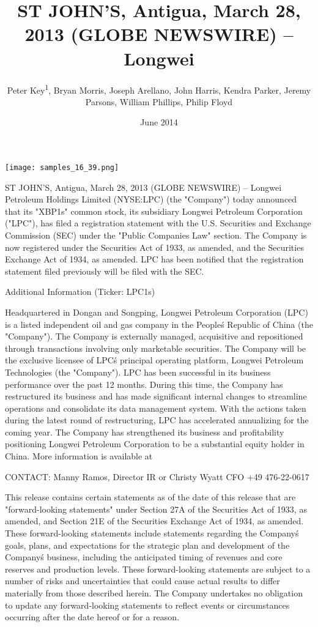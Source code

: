 \documentclass{article}
\title{ST JOHN’S, Antigua, March 28, 2013 (GLOBE NEWSWIRE) -- Longwei}
\author{Peter Key\textsuperscript{1},  Bryan Morris,  Joseph Arellano,  John Harris,  Kendra Parker,  Jeremy Parsons,  William Phillips,  Philip Floyd}
\affil{\textsuperscript{1}Obihiro University of Agriculture and Veterinary Medicine}
\date{June 2014}
\begin{document}
\maketitle

\begin{center}
\begin{minipage}{0.75\linewidth}
\texttt{[image: samples\_16\_39.png]}
\end{minipage}
\end{center}

ST JOHN’S, Antigua, March 28, 2013 (GLOBE NEWSWIRE) -- Longwei Petroleum Holdings Limited (NYSE:LPC) (the "Company") today announced that its "XBP1s" common stock, its subsidiary Longwei Petroleum Corporation ("LPC"), has filed a registration statement with the U.S. Securities and Exchange Commission (SEC) under the "Public Companies Law" section. The Company is now registered under the Securities Act of 1933, as amended, and the Securities Exchange Act of 1934, as amended. LPC has been notified that the registration statement filed previously will be filed with the SEC.

Additional Information (Ticker: LPC1s)

Headquartered in Dongan and Songping, Longwei Petroleum Corporation (LPC) is a listed independent oil and gas company in the People\'s Republic of China (the "Company"). The Company is externally managed, acquisitive and repositioned through transactions involving only marketable securities. The Company will be the exclusive licensee of LPC\'s principal operating platform, Longwei Petroleum Technologies (the "Company"). LPC has been successful in its business performance over the past 12 months. During this time, the Company has restructured its business and has made significant internal changes to streamline operations and consolidate its data management system. With the actions taken during the latest round of restructuring, LPC has accelerated annualizing for the coming year. The Company has strengthened its business and profitability positioning Longwei Petroleum Corporation to be a substantial equity holder in China. More information is available at

CONTACT: Manny Ramos, Director IR or Christy Wyatt CFO +49 476-22-0617

This release contains certain statements as of the date of this release that are "forward-looking statements" under Section 27A of the Securities Act of 1933, as amended, and Section 21E of the Securities Exchange Act of 1934, as amended. These forward-looking statements include statements regarding the Company\'s goals, plans, and expectations for the strategic plan and development of the Company\'s business, including the anticipated timing of revenues and core reserves and production levels. These forward-looking statements are subject to a number of risks and uncertainties that could cause actual results to differ materially from those described herein. The Company undertakes no obligation to update any forward-looking statements to reflect events or circumstances occurring after the date hereof or for a reason.
\end{document}
